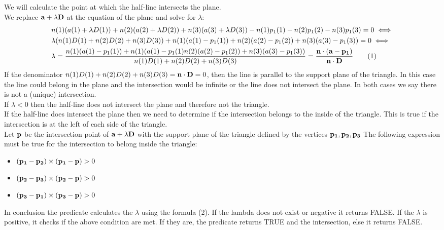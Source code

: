 \documentclass[11pt]{article}
\newcommand\numberthis{\addtocounter{equation}{1}\tag{\theequation}}
\begin{document}
\begin{enumerate}
		We will calculate the point at which the half-line intersects the plane.\\
		We replace ${\bf a}+\lambda{\bf D}$ at the equation of the plane and solve for $\lambda$:
		\begin{align*}
			&n(1)(a(1)+\lambda D(1))+n(2)(a(2)+\lambda D(2))+n(3)(a(3)+\lambda D(3))-n(1)p_1(1)-n(2)p_1(2)-n(3)p_1(3)=0 \iff\\
			&\lambda(n(1)D(1)+n(2)D(2)+n(3)D(3))+n(1)(a(1)-p_1(1))+n(2)(a(2)-p_1(2))+n(3)(a(3)-p_1(3))=0\iff\\
			&\lambda=\frac{n(1)(a(1)-p_1(1))+n(1)(a(1)-p_1(1)n(2)(a(2)-p_1(2))+n(3)(a(3)-p_1(3))}{n(1)D(1)+n(2)D(2)+n(3)D(3)}=\frac{{{\bf n}\cdot({\bf a}-{\bf p_1})}}{{\bf n}\cdot{\bf D}}\numberthis
		\end{align*}
		If the denominator $n(1)D(1)+n(2)D(2)+n(3)D(3) = {\bf n}\cdot{\bf D}=0$, then the line is parallel to the support plane of the triangle. In this case the line could belong in the plane and the intersection would be infinite or the line does not intersect the plane. In both cases we say there is not a (unique) intersection.\\
			
		If $\lambda<0$ then the half-line does not intersect the plane and therefore not the triangle.\\
		
		If the half-line does intersect the plane then we need to determine if the intersection belongs to the inside of the triangle. This is true if the intersection is at the left of each side of the triangle.\\
		
		Let ${\bf p}$ be the intersection point of ${\bf a}+\lambda{\bf D}$ with the support plane of the triangle defined by the vertices ${\bf p_1},{\bf p_2},{\bf p_3}$
		The following expression must be true for the intersection to belong inside the triangle:
		\begin{itemize}
			\item $({\bf p_1}-{\bf p_2})\times({\bf p_1}-{\bf p})>0$
			\item $({\bf p_2}-{\bf p_3})\times({\bf p_2}-{\bf p})>0$
			\item $({\bf p_3}-{\bf p_1})\times({\bf p_3}-{\bf p})>0$
		\end{itemize}
	
		In conclusion the predicate calculates the $\lambda$ using the formula (2). If the lambda does not exist or negative it returns FALSE. If the $\lambda$ is positive, it checks if the above condition are met. If they are, the predicate returns TRUE and the intersection, else it returns FALSE.
	\end{enumerate}
	
\end{document}
